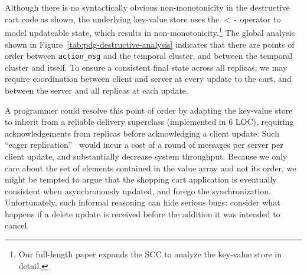 

Although there is no syntactically obvious non-monotonicity in the destructive
cart code as shown, the underlying key-value store uses the \texttt{$<$-} operator to model updateable state, which results in non-monotonicity.\footnote{Our full-length paper expands the SCC to analyze the
key-value store in detail.}
The global analysis shown in Figure~\ref{tab:pdg-destructive-analysis}
indicates that there are
points of order between \texttt{action\_msg} and the temporal cluster,
and between the temporal cluster and itself.
To ensure a consistent final state across all replicas, we may require coordination
between client and server at every update to the cart, and between the 
server and all replicas at each update.   


A programmer could resolve this point of order by adapting the key-value store
to inherit from a reliable delivery superclass (implemented in 6 LOC), requiring 
acknowledgements from replicas before acknowledging a client update.
Such ``eager replication''~\cite{dangers} would incur a cost of a round of messages
per server per client update, and substantially decrease system throughput.  
Because we only care about the set of elements contained in the value array
and not its order, we might be tempted to argue that 
the shopping cart application is eventually consistent
when asynchronously updated, and forego the synchronization.  Unfortunately, such informal reasoning can hide serious bugs: consider what happens if a delete update is received
before the addition it was intended to cancel.



